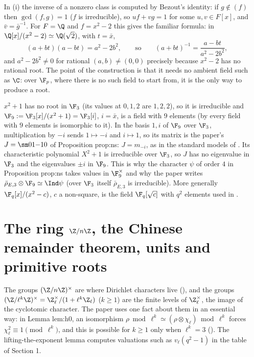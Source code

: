 In (i) the inverse of a nonzero class is computed by Bezout's identity: if $g\notin(f)$ then $\gcd(f,g)=1$ ($f$ is irreducible), so $uf+vg=1$
for some $u,v\in F[x]$, and $\bar v=\bar g^{-1}$. For $F=\Q$ and $f=x^2-2$ this gives the familiar formula: in $\Q[x]/(x^2-2)\simeq\Q(\sqrt2)$, with
$t=\bar x$,
\[
(a+bt)(a-bt)=a^2-2b^2,\qquad\text{so}\qquad(a+bt)^{-1}=\frac{a-bt}{a^2-2b^2},
\]
and $a^2-2b^2\ne0$ for rational $(a,b)\ne(0,0)$ precisely because $x^2-2$ has no rational root. The point of the construction is that it
needs no ambient field such as $\C$: over $\F_p$, where there is no such field to start from, it is the only way to produce a root.

\begin{example}\label{ex:rings:f9}
$x^2+1$ has no root in $\F_3$ (its values at $0,1,2$ are $1,2,2$), so it is irreducible and $\F_9:=\F_3[x]/(x^2+1)=\F_3[i]$, $i=\bar x$, is a field with $9$
elements (by  every field with $9$ elements is isomorphic to it). In the basis $1,i$ of $\F_9$ over $\F_3$,
multiplication by $-i$ sends $1\mapsto-i$ and $i\mapsto1$, so its matrix is the paper's $J=\sm01{-1}0$ of Proposition prop:ns: $J=m_{-i}$, as in
the standard models of . Its characteristic polynomial $X^2+1$ is irreducible over $\F_3$, so $J$ has no eigenvalue in
$\F_3$ and the eigenvalues $\pm i$ in $\F_9$. This is why the character $\psi$ of order $4$ in Proposition prop:ns takes values in $\F_9^\times$ and
why the paper writes $\bar\rho_{E,3}\otimes\F_9\simeq\Ind\psi$ (over $\F_3$ itself $\bar\rho_{E,3}$ is irreducible). More generally
$\F_q[x]/(x^2-c)$, $c$ a non-square, is the field $\F_q[\sqrt c]$ with $q^2$ elements used in .
\end{example}

\section[The ring \texorpdfstring{$\Z/n\Z$}{Z/nZ}, units and primitive roots]{The ring \texorpdfstring{$\Z/n\Z$}{Z/nZ}, the Chinese remainder theorem, units and primitive roots}\label{sec:rings:zn}

The groups $(\Z/n\Z)^\times$ are where Dirichlet characters live (), and the groups
$(\Z/\ell^k\Z)^\times=\Z_\ell^\times/(1+\ell^k\Z_\ell)$ ($k\ge1$) are the finite levels of $\Z_\ell^\times$, the image of the cyclotomic character. The paper uses one fact about them in an essential way:
in Lemma lem:h0, an isomorphism $\rho\bmod\ell^k\simeq(\rho\otimes\chi_\ell)\bmod\ell^k$ forces $\chi_\ell^2\equiv1\pmod{\ell^k}$, and this is possible
for $k\ge1$ only when $\ell^k=3$ (). The lifting-the-exponent lemma computes valuations such as $v_\ell(q^2-1)$ in the
table of Section 1.

